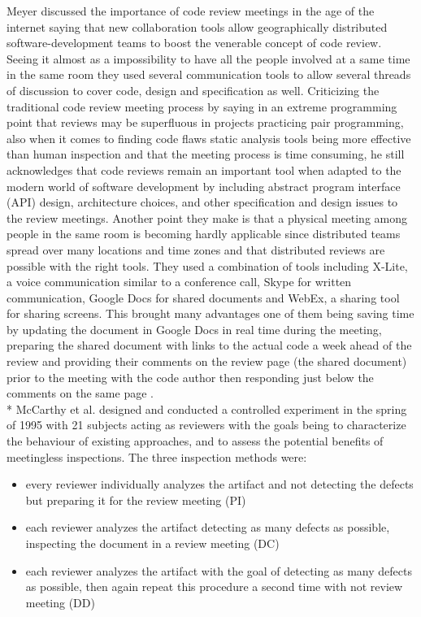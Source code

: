 Meyer discussed the importance of code review meetings in the age of the internet saying that new collaboration tools allow geographically distributed software-development teams to boost the venerable concept of code review. Seeing it almost as a impossibility to have all the people involved at a same time in the same room they used several communication tools to allow several threads of discussion to cover code, design and specification as well. Criticizing the traditional code review meeting process by saying in an extreme programming point that reviews may be superfluous in projects practicing pair programming, also when it comes to finding code flaws static analysis tools being more effective than human inspection and that the meeting process is time consuming, he still acknowledges that code reviews remain an important tool when adapted to the modern world of software development by including abstract program interface (API) design, architecture choices, and other specification and design issues to the review meetings. Another point they make is that a physical meeting among people in the same room is becoming hardly applicable since distributed teams spread over many locations and time zones and that distributed reviews are possible with the right tools. They used a combination of tools including X-Lite, a voice communication similar to a conference call, Skype for written communication, Google Docs for shared documents and WebEx, a sharing tool for sharing screens. This brought many advantages one of them being saving time by updating the document in Google Docs in real time during the meeting, preparing the shared document with links to the actual code a week ahead of the review and providing their comments on the review page (the shared document) prior to the meeting with the code author then responding just below the comments on the same page \cite{Meyer_2008}. \\*
McCarthy et al. designed and conducted a controlled experiment in the spring of 1995 with 21 subjects acting as reviewers with the goals being to characterize the behaviour of existing approaches, and to assess the potential benefits of meetingless inspections. The three inspection methods were:
\begin{itemize}
	\item every reviewer individually analyzes the artifact and not detecting the defects but preparing it for the review meeting (PI)
	\item each reviewer analyzes the artifact detecting as many defects as possible, inspecting the document in a review meeting (DC)
	\item each reviewer analyzes the artifact with the goal of detecting as many defects as possible, then again repeat this procedure a second time with not review meeting (DD)
\end{itemize}

